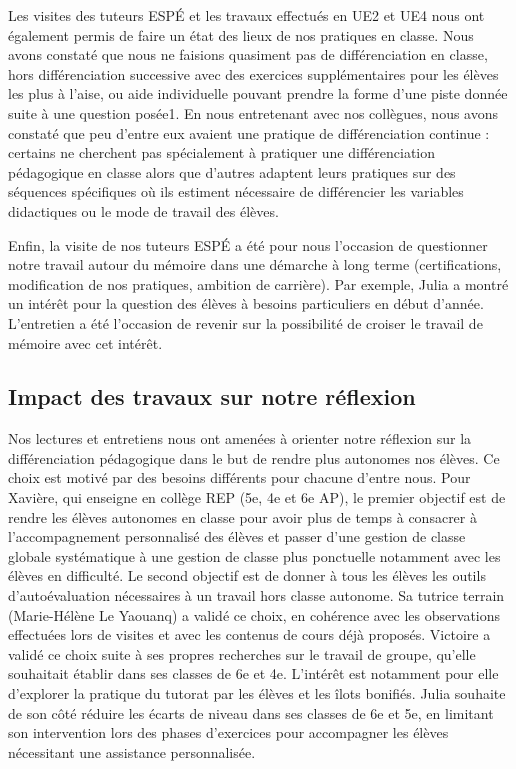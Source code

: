 Les visites des tuteurs ESPÉ et les travaux effectués en UE2 et UE4 nous ont également permis de faire un état des lieux de nos pratiques en classe. Nous avons constaté que nous ne faisions quasiment pas de différenciation en classe, hors différenciation successive avec des exercices supplémentaires pour les élèves les plus à l’aise, ou aide individuelle pouvant prendre la forme d’une piste donnée suite à une question posée1. 
En nous entretenant avec nos collègues, nous avons constaté que peu d’entre eux avaient une pratique de différenciation continue : certains ne cherchent pas spécialement à pratiquer une différenciation pédagogique en classe alors que d’autres adaptent leurs pratiques sur des séquences spécifiques où ils estiment nécessaire de différencier les variables didactiques ou le mode de travail des élèves.

Enfin, la visite de nos tuteurs ESPÉ a été pour nous l’occasion de questionner notre travail autour du mémoire dans une démarche à long terme (certifications, modification de nos pratiques, ambition de carrière). Par exemple, Julia a montré un intérêt pour la question des élèves à besoins particuliers en début d’année. L’entretien a été l’occasion de revenir sur la possibilité de croiser le travail de mémoire avec cet intérêt. 

\subsection{Impact des travaux sur notre réflexion}

Nos lectures et entretiens nous ont amenées à orienter notre réflexion sur la différenciation pédagogique dans le but de rendre plus autonomes nos élèves. Ce choix est motivé par des besoins différents pour chacune d’entre nous. Pour Xavière, qui enseigne en collège REP (5e, 4e et 6e AP),  le premier objectif est de rendre les élèves autonomes en classe pour avoir plus de temps à consacrer à l’accompagnement personnalisé des élèves et passer d’une gestion de classe globale systématique à une gestion de classe plus ponctuelle notamment avec les élèves en difficulté. Le second objectif est de donner à tous les élèves les outils d’autoévaluation nécessaires à un travail hors classe autonome. Sa tutrice terrain (Marie-Hélène Le Yaouanq) a validé ce choix, en cohérence avec les observations effectuées lors de visites et avec les contenus de cours déjà proposés. Victoire a validé ce choix suite à ses propres recherches sur le travail de groupe, qu’elle souhaitait établir dans ses classes de 6e et 4e. L’intérêt est notamment pour elle d’explorer la pratique du tutorat par les élèves et les îlots bonifiés. Julia souhaite de son côté réduire les écarts de niveau dans ses classes de 6e et 5e, en limitant son intervention lors des phases d’exercices pour accompagner les élèves nécessitant une assistance personnalisée.

